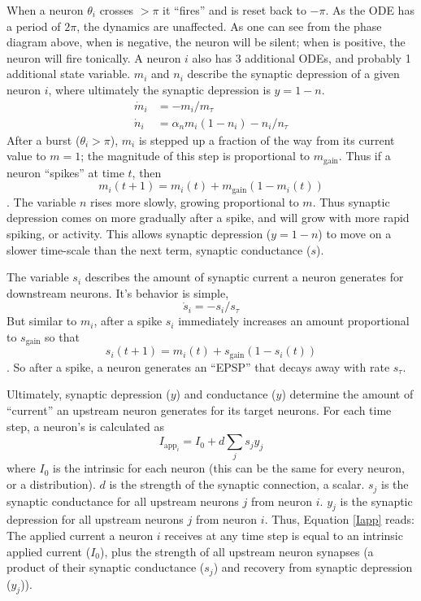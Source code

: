 \documentclass{article}
\begin{document}
When a neuron $\theta_i$ crosses $>\pi$ it ``fires'' and is reset back to $-\pi$. As the ODE has a period of $2\pi$, the dynamics are unaffected. As one can see from the phase diagram above, when \Iapp is negative, the neuron will be silent; when \Iapp is positive, the neuron will fire tonically.
\vskip 2mm
A neuron $i$ also has 3 additional ODEs, and probably 1 additional state variable. $m_i$ and $n_i$ describe the synaptic depression of a given neuron $i$, where ultimately the synaptic depression is $y=1-n$.
\begin{align}
    \dot{m}_i &= -m_i/m_\tau \\
    \dot{n}_i &= \alpha_n m_i (1-n_i) - n_i/n_\tau
\end{align}
\vskip 2mm
After a burst ($\theta_i>\pi$), $m_i$ is stepped up a fraction of the way from its current value to $m=1$; the magnitude of this step is proportional to $m_\text{gain}$. Thus if a neuron ``spikes'' at time $t$, then
\[m_i(t+1) = m_i(t) + m_\text{gain}(1-m_i(t))\].
\vskip2mm
The variable $n$ rises more slowly, growing proportional to $m$. Thus synaptic depression comes on more gradually after a spike, and will grow with more rapid spiking, or activity. This allows synaptic depression ($y=1-n$) to move on a slower time-scale than the next term, synaptic conductance ($s$).

\vskip 2mm
The variable $s_i$ describes the amount of synaptic current a neuron generates for downstream neurons. It's behavior is simple,
\begin{equation}
    \dot{s}_i =-s_i/s_\tau
\end{equation}
But similar to $m_i$, after a spike $s_i$ immediately increases an amount proportional to $s_\text{gain}$ so that
\[s_i(t+1) = m_i(t) + s_\text{gain}(1-s_i(t))\]. So after a spike, a neuron generates an ``EPSP'' that decays away with rate $s_\tau$.

\vskip 2mm

Ultimately, synaptic depression ($y$) and conductance ($y$) determine the amount of ``current'' an upstream neuron generates for its target neurons. For each time step, a neuron's \Iappi is calculated as
\begin{equation}\label{Iapp}I_{\text{app}_i} = I_0 + d\sum_j s_j y_j\end{equation}
where $I_0$ is the intrinsic \Iapp for each neuron (this can be the same for every neuron, or a distribution). $d$ is the strength of the synaptic connection, a scalar. $s_j$ is the synaptic conductance for all upstream neurons $j$ from neuron $i$. $y_j$ is the synaptic depression for all upstream neurons $j$ from neuron $i$. Thus, Equation \ref{Iapp} reads: The applied current a neuron $i$ receives at any time step is equal to an intrinsic applied current ($I_0$), plus the strength of all upstream neuron synapses (a product of their synaptic conductance ($s_j$) and recovery from synaptic depression ($y_j$)). 
\end{document}
